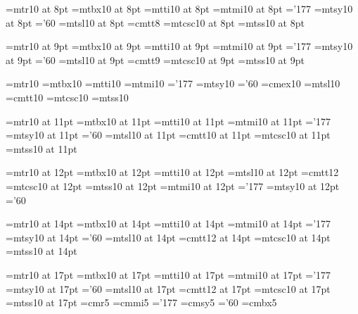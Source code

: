 \font\eightrm=mtr10 at 8pt
\font\eightbf=mtbx10 at 8pt
\font\eightit=mtti10 at 8pt
\font\eighti=mtmi10 at 8pt      \skewchar\eighti='177
\font\eightsy=mtsy10 at 8pt     \skewchar\eightsy='60
\font\eightsl=mtsl10 at 8pt
\font\eighttt=cmtt8             \hyphenchar{}
\font\eightcsc=mtcsc10 at 8pt
\font\eightsf=mtss10 at 8pt

\font\ninerm=mtr10 at 9pt
\font\ninebf=mtbx10 at 9pt
\font\nineit=mtti10 at 9pt
\font\ninei=mtmi10 at 9pt      \skewchar\ninei='177
\font\ninesy=mtsy10 at 9pt     \skewchar\ninesy='60
\font\ninesl=mtsl10 at 9pt
\font\ninett=cmtt9             \hyphenchar{}
\font\ninecsc=mtcsc10 at 9pt
\font\ninesf=mtss10 at 9pt

\font\tenrm=mtr10
\font\tenbf=mtbx10
\font\tenit=mtti10
\font\teni=mtmi10		\skewchar\teni='177
\font\tensy=mtsy10		\skewchar\tensy='60
\font\tenex=cmex10
\font\tensl=mtsl10
\font\tentt=cmtt10		\hyphenchar{}
\font\tencsc=mtcsc10
\font\tensf=mtss10

\font\elevenrm=mtr10 at 11pt
\font\elevenbf=mtbx10 at 11pt
\font\elevenit=mtti10 at 11pt
\font\eleveni=mtmi10 at 11pt      \skewchar\eleveni='177
\font\elevensy=mtsy10 at 11pt     \skewchar\elevensy='60
\font\elevensl=mtsl10 at 11pt
\font\eleventt=cmtt10 at 11pt     \hyphenchar{}
\font\elevencsc=mtcsc10 at 11pt
\font\elevensf=mtss10 at 11pt

\font\twelverm=mtr10 at 12pt
\font\twelvebf=mtbx10 at 12pt
\font\twelveit=mtti10 at 12pt
\font\twelvesl=mtsl10 at 12pt
\font\twelvett=cmtt12             \hyphenchar{}
\font\twelvecsc=mtcsc10 at 12pt
\font\twelvesf=mtss10 at 12pt
\font\twelvei=mtmi10 at 12pt      \skewchar\twelvei='177
\font\twelvesy=mtsy10 at 12pt     \skewchar\twelvesy='60

\font\fourteenrm=mtr10 at 14pt
\font\fourteenbf=mtbx10 at 14pt
\font\fourteenit=mtti10 at 14pt
\font\fourteeni=mtmi10 at 14pt      \skewchar\fourteeni='177
\font\fourteensy=mtsy10 at 14pt     \skewchar\fourteensy='60
\font\fourteensl=mtsl10 at 14pt
\font\fourteentt=cmtt12 at 14pt     \hyphenchar{}
\font\fourteencsc=mtcsc10 at 14pt
\font\fourteensf=mtss10 at 14pt

\font\seventeenrm=mtr10 at 17pt
\font\seventeenbf=mtbx10 at 17pt
\font\seventeenit=mtti10 at 17pt
\font\seventeeni=mtmi10 at 17pt      \skewchar\seventeeni='177
\font\seventeensy=mtsy10 at 17pt     \skewchar\seventeensy='60
\font\seventeensl=mtsl10 at 17pt
\font\seventeentt=cmtt12 at 17pt     \hyphenchar{}
\font\seventeencsc=mtcsc10 at 17pt
\font\seventeensf=mtss10 at 17pt
%
\else
%
\font\fiverm=cmr5
\font\fivei=cmmi5             \skewchar\fivei='177
\font\fivesy=cmsy5            \skewchar\fivesy='60
\font\fivebf=cmbx5

